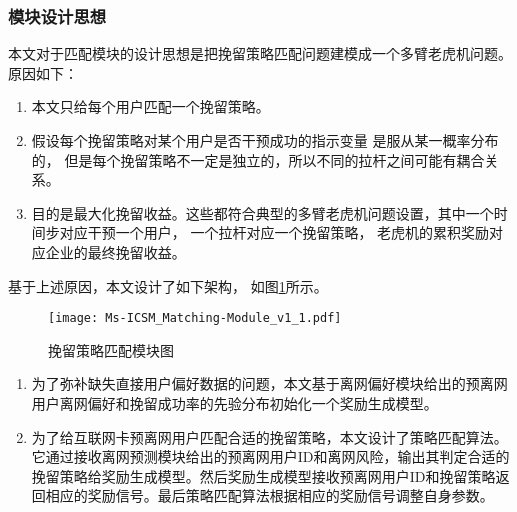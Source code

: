 \subsubsection{模块设计思想}\par
	本文对于匹配模块的设计思想是把挽留策略匹配问题建模成一个多臂老虎机问题。
	原因如下：
\begin{enumerate}	
	\item 本文只给每个用户匹配一个挽留策略。
	\item 假设每个挽留策略对某个用户是否干预成功的指示变量 是服从某一概率分布的， 但是每个挽留策略不一定是独立的，所以不同的拉杆之间可能有耦合关系。 
	\item 目的是最大化挽留收益。这些都符合典型的多臂老虎机问题设置，其中一个时间步对应干预一个用户， 一个拉杆对应一个挽留策略， 老虎机的累积奖励对应企业的最终挽留收益。
\end{enumerate}
	基于上述原因，本文设计了如下架构， 如图\ref{Fig:Matching-Module}所示。

\begin{figure}[hbt]
	\centering
	\texttt{[image: Ms-ICSM\_Matching-Module\_v1\_1.pdf]}
	\caption{挽留策略匹配模块图}
	\label{Fig:Matching-Module}
\end{figure}	
	
	\begin{enumerate}	
		\item 为了弥补缺失直接用户偏好数据的问题，本文基于离网偏好模块给出的预离网用户离网偏好和挽留成功率的先验分布初始化一个奖励生成模型。
		\item 为了给互联网卡预离网用户匹配合适的挽留策略，本文设计了策略匹配算法。它通过接收离网预测模块给出的预离网用户ID和离网风险，输出其判定合适的挽留策略给奖励生成模型。然后奖励生成模型接收预离网用户ID和挽留策略返回相应的奖励信号。最后策略匹配算法根据相应的奖励信号调整自身参数。
	\end{enumerate}	


